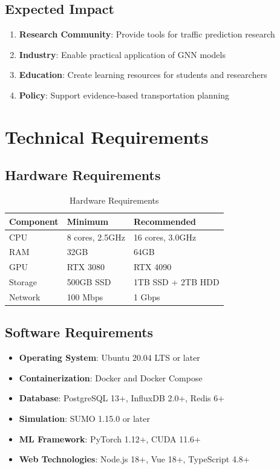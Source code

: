 \documentclass[12pt,a4paper]{article}
\begin{document}
\subsection{Expected Impact}

\begin{enumerate}
    \item \textbf{Research Community}: Provide tools for traffic prediction research
    \item \textbf{Industry}: Enable practical application of GNN models
    \item \textbf{Education}: Create learning resources for students and researchers
    \item \textbf{Policy}: Support evidence-based transportation planning
\end{enumerate}

\section{Technical Requirements}

\subsection{Hardware Requirements}

\begin{table}[h]
\centering
\begin{tabular}{|l|l|l|}
\hline
\textbf{Component} & \textbf{Minimum} & \textbf{Recommended} \\
\hline
CPU & 8 cores, 2.5GHz & 16 cores, 3.0GHz \\
RAM & 32GB & 64GB \\
GPU & RTX 3080 & RTX 4090 \\
Storage & 500GB SSD & 1TB SSD + 2TB HDD \\
Network & 100 Mbps & 1 Gbps \\
\hline
\end{tabular}
\caption{Hardware Requirements}
\label{tab:hardware}
\end{table}

\subsection{Software Requirements}

\begin{itemize}
    \item \textbf{Operating System}: Ubuntu 20.04 LTS or later
    \item \textbf{Containerization}: Docker and Docker Compose
    \item \textbf{Database}: PostgreSQL 13+, InfluxDB 2.0+, Redis 6+
    \item \textbf{Simulation}: SUMO 1.15.0 or later
    \item \textbf{ML Framework}: PyTorch 1.12+, CUDA 11.6+
    \item \textbf{Web Technologies}: Node.js 18+, Vue 18+, TypeScript 4.8+
\end{itemize}
\end{document}
